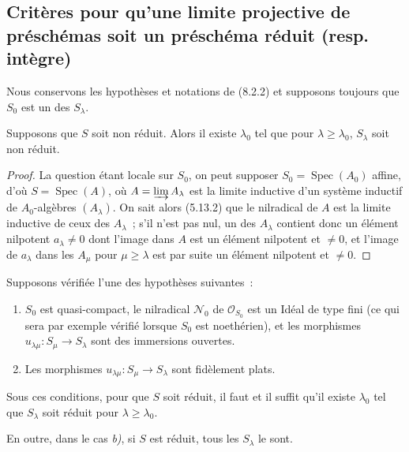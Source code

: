 \subsection{Critères pour qu'une limite projective de préschémas soit un préschéma réduit (resp. intègre)}
\label{subsection:IV.8.7-fr}

Nous conservons les hypothèses et notations de (8.2.2) et supposons toujours
que $S_0$ est un des $S_\lambda$.

\begin{proposition}[8.7.1]
\label{IV.8.7.1-fr}
Supposons que $S$ soit non réduit. Alors il existe $\lambda_0$ tel que pour
$\lambda\geq\lambda_0$, $S_\lambda$ soit non réduit.
\end{proposition}

\begin{proof}
La question étant locale sur $S_0$, on peut supposer
$S_0=\operatorname{Spec}(A_0)$ affine, d'où $S=\operatorname{Spec}(A)$, où
$A=\varinjlim A_\lambda$ est la limite inductive d'un système inductif de
$A_0$-algèbres $(A_\lambda)$. On sait alors (5.13.2) que le nilradical de $A$
est la limite inductive de ceux des $A_\lambda$~; s'il n'est pas nul, un des
$A_\lambda$ contient donc un élément nilpotent $a_\lambda\neq0$ dont l'image
dans $A$ est un élément nilpotent et $\neq0$, et l'image de $a_\lambda$ dans
les $A_\mu$ pour $\mu\geq\lambda$ est par suite un élément nilpotent et
$\neq0$.
\end{proof}

\begin{proposition}[8.7.2]
\label{IV.8.7.2-fr}
Supposons vérifiée l'une des hypothèses suivantes~:
\begin{enumerate}
\item[\emph{a)}] $S_0$ est quasi-compact, le nilradical $\mathcal N_0$ de
$\mathcal O_{S_0}$ est un Idéal de type fini (ce qui sera par exemple vérifié
lorsque $S_0$ est noethérien), et les morphismes
$u_{\lambda\mu}:S_\mu\to S_\lambda$ sont des immersions ouvertes.
\item[\emph{b)}] Les morphismes $u_{\lambda\mu}:S_\mu\to S_\lambda$ sont
fidèlement plats.
\end{enumerate}
Sous ces conditions, pour que $S$ soit réduit, il faut et il suffit qu'il
existe $\lambda_0$ tel que $S_\lambda$ soit réduit pour
$\lambda\geq\lambda_0$.

En outre, dans le cas \emph{b)}, si $S$ est réduit, tous les $S_\lambda$ le
sont.
\end{proposition}

